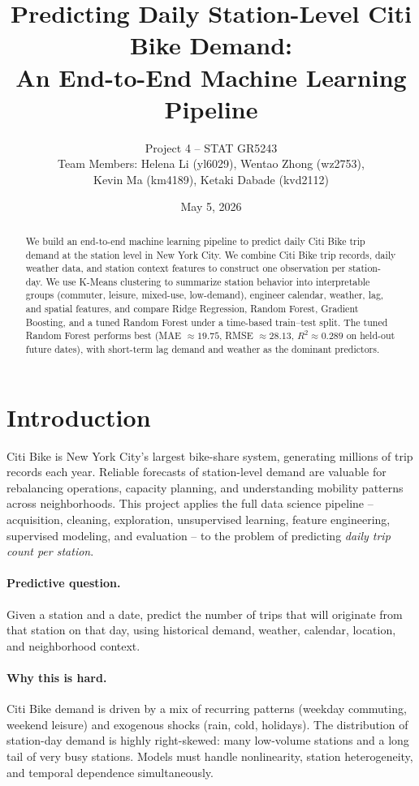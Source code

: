 \documentclass[11pt]{article}
\title{\textbf{Predicting Daily Station-Level Citi Bike Demand:\\
An End-to-End Machine Learning Pipeline}}
\author{Project 4 -- STAT GR5243 \\
Team Members: Helena Li (yl6029), Wentao Zhong (wz2753),\\
Kevin Ma (km4189), Ketaki Dabade (kvd2112)}
\date{May 5, 2026}
\begin{document}
\maketitle

\begin{abstract}
\noindent We build an end-to-end machine learning pipeline to predict daily Citi Bike trip
demand at the station level in New York City. We combine Citi Bike trip records,
daily weather data, and station context features to construct one observation per
station-day. We use K-Means clustering to summarize station behavior into
interpretable groups (commuter, leisure, mixed-use, low-demand), engineer
calendar, weather, lag, and spatial features, and compare Ridge Regression,
Random Forest, Gradient Boosting, and a tuned Random Forest under a time-based
train--test split. The tuned Random Forest performs best (MAE $\approx 19.75$,
RMSE $\approx 28.13$, $R^2 \approx 0.289$ on held-out future dates), with
short-term lag demand and weather as the dominant predictors.
\end{abstract}

\section{Introduction}

Citi Bike is New York City's largest bike-share system, generating millions of
trip records each year. Reliable forecasts of station-level demand are valuable
for rebalancing operations, capacity planning, and understanding mobility
patterns across neighborhoods. This project applies the full data science
pipeline -- acquisition, cleaning, exploration, unsupervised learning, feature
engineering, supervised modeling, and evaluation -- to the problem of predicting
\emph{daily trip count per station}.

\paragraph{Predictive question.}
Given a station and a date, predict the number of trips that will originate from
that station on that day, using historical demand, weather, calendar, location,
and neighborhood context.

\paragraph{Why this is hard.}
Citi Bike demand is driven by a mix of recurring patterns (weekday commuting,
weekend leisure) and exogenous shocks (rain, cold, holidays). The distribution
of station-day demand is highly right-skewed: many low-volume stations and a
long tail of very busy stations. Models must handle nonlinearity, station
heterogeneity, and temporal dependence simultaneously.
\end{document}
